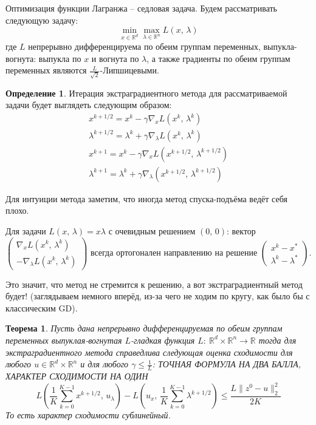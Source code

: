 \documentclass[a4paper,12pt]{article}
\renewcommand{\leq}{\ensuremath{\leqslant}}
\theoremstyle{plain}
\newtheorem{theorem}{Теорема}[section]
\theoremstyle{definition}
\newtheorem{definition}{Определение}[section]
\theoremstyle{remark}
\begin{document}
Оптимизация функции Лагранжа -- седловая задача. Будем рассматривать следующую задачу:
\[
	\min_{x \in \mathbb{R}^d}\max_{\lambda \in \mathbb{R}^n} L(x,\, \lambda)
\]
где $L$ непрерывно дифференцируема по обеим группам переменных, выпукла-вогнута: выпукла по $x$ и вогнута по $\lambda$, а также градиенты по обеим группам переменных являются $\frac{L}{\sqrt{2}}$-Липшицевыми.

\begin{definition}
	Итерация экстраградиентного метода для рассматриваемой задачи будет выглядеть следующим образом:
	\begin{align*}
		x^{k + 1/2} = x^k - \gamma\nabla_xL(x^k,\, \lambda^k)                    \\
		\lambda^{k + 1/2} = \lambda^k + \gamma\nabla_\lambda L(x^k,\, \lambda^k) \\
		x^{k + 1} = x^k - \gamma\nabla_x L(x^{k + 1/2},\, \lambda^{k + 1/2})     \\
		\lambda^{k + 1} = \lambda^k + \gamma\nabla_\lambda(x^{k + 1/2},\, \lambda^{k + 1/2})
	\end{align*}
\end{definition}

Для интуиции метода заметим, что иногда метод спуска-подъёма ведёт себя плохо.

Для задачи $L(x,\, \lambda) = x\lambda$ с очевидным решением $(0,\, 0)$: вектор
$\begin{pmatrix}
		\nabla_x L(x^k,\, \lambda^k) \\
		-\nabla_\lambda L(x^k,\, \lambda^k)
	\end{pmatrix}$ всегда ортогонален направлению на решение $\begin{pmatrix}
		x^k - x^* \\
		\lambda^k - \lambda^*
	\end{pmatrix}$.

Это значит, что метод не стремится к решению, а вот экстраградиентный метод будет! (заглядываем немного вперёд, из-за чего не ходим по кругу, как было бы с классическим GD).

\begin{theorem}
	Пусть дана непрерывно дифференцируемая по обеим группам переменных выпуклая-вогнутая $L$-гладкая функция $L :\: \mathbb{R}^d \times \mathbb{R}^n \to \mathbb{R}$ тогда для экстраградиентного метода справедлива следующая оценка сходимости для любого $u \in \mathbb{R}^d \times \mathbb{R}^n$ и для любого $\gamma \leq \frac{1}{L}$: ТОЧНАЯ ФОРМУЛА НА ДВА БАЛЛА, ХАРАКТЕР СХОДИМОСТИ НА ОДИН
	\[
		L\left(\frac{1}{K}\sum_{k = 0}^{K - 1}x^{k + 1/2},\, u_\lambda\right) - L\left(u_x,\, \frac{1}{K}\sum_{k = 0}^{K - 1}\lambda^{k + 1/2}\right) \leq \frac{L\|z^0 - u\|_2^2}{2 K}
	\]
	То есть характер сходимости сублинейный.
\end{theorem}
\end{document}

